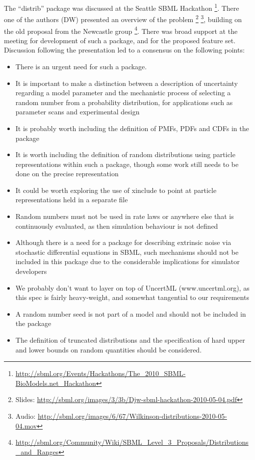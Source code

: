 \documentclass[draftspec]{sbmlpkgspec}
\begin{document}
The ``distrib'' package was discussed at the Seattle SBML Hackathon%
\footnote{\url{http://sbml.org/Events/Hackathons/The_2010_SBML-BioModels.net_Hackathon}}. There
one of the authors (DW) presented an overview of the problem%
\footnote{Slides:
 \url{http://sbml.org/images/3/3b/Djw-sbml-hackathon-2010-05-04.pdf}}%
\footnote{Audio:
  \url{http://sbml.org/images/6/67/Wilkinson-distributions-2010-05-04.mov}},
building on the old proposal from the Newcastle group%
\footnote{\url{http://sbml.org/Community/Wiki/SBML_Level_3_Proposals/Distributions_and_Ranges}}.
There was broad support at the meeting for development of such a
package, and for the proposed feature set. Discussion following the
presentation led to a consensus on the following points:

\begin{itemize}
\item There is an urgent need for such a package.
\item It is important to make a distinction between a description of
  uncertainty regarding a model parameter and the mechanistic process
  of selecting a random number from a probability distribution, for
  applications such as parameter scans and experimental design
\item It is probably worth including the definition of PMFs, PDFs and CDFs in the package
\item It is worth including the definition of random distributions using particle representations within such a package, though some work
 still needs to be done on the precise representation
\item It could be worth exploring the use of xinclude to point at particle
representations held in a separate file
\item Random numbers must not be used in rate laws or anywhere else that
 is continuously evaluated, as then simulation behaviour is not
 defined
\item Although there is a need for a package for describing extrinsic
 noise via stochastic differential equations in SBML, such mechanisms
 should not be included in this package due to the considerable
 implications for simulator developers
\item We probably don't want to layer on top of UncertML
 (www.uncertml.org), as this spec is fairly heavy-weight, and
 somewhat tangential to our requirements
\item A random number seed is not part of a model and should not be
 included in the package
\item The definition of truncated distributions and the specification of
 hard upper and lower bounds on random quantities should be
 considered.
\end{itemize}
\end{document}
